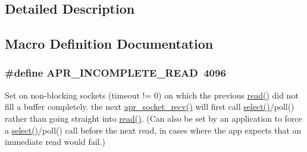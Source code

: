 \subsection{Detailed Description}


\subsection{Macro Definition Documentation}
\subsubsection[{\texorpdfstring{A\+P\+R\+\_\+\+I\+N\+C\+O\+M\+P\+L\+E\+T\+E\+\_\+\+R\+E\+AD}{APR_INCOMPLETE_READ}}]{\setlength{\rightskip}{0pt plus 5cm}\#define A\+P\+R\+\_\+\+I\+N\+C\+O\+M\+P\+L\+E\+T\+E\+\_\+\+R\+E\+AD~4096}\hypertarget{group__apr__sockopt_ga73b6c80791c5148c2a416e03a8a1ff8a}{}\label{group__apr__sockopt_ga73b6c80791c5148c2a416e03a8a1ff8a}
Set on non-\/blocking sockets (timeout != 0) on which the previous \hyperlink{group__APACHE__CORE__PROTO_ga1a70a7c483d1279dc2cbfc7f098ce8db}{read()} did not fill a buffer completely. the next \hyperlink{unix_2sendrecv_8c_aa6ee00191f197f64b5a5409f4aff53d1}{apr\+\_\+socket\+\_\+recv()} will first call \hyperlink{apr__arch__os2calls_8h_a2b406456012f9f74aeb33de6f3df053c}{select()}/poll() rather than going straight into \hyperlink{group__APACHE__CORE__PROTO_ga1a70a7c483d1279dc2cbfc7f098ce8db}{read()}. (Can also be set by an application to force a \hyperlink{apr__arch__os2calls_8h_a2b406456012f9f74aeb33de6f3df053c}{select()}/poll() call before the next read, in cases where the app expects that an immediate read would fail.) 
